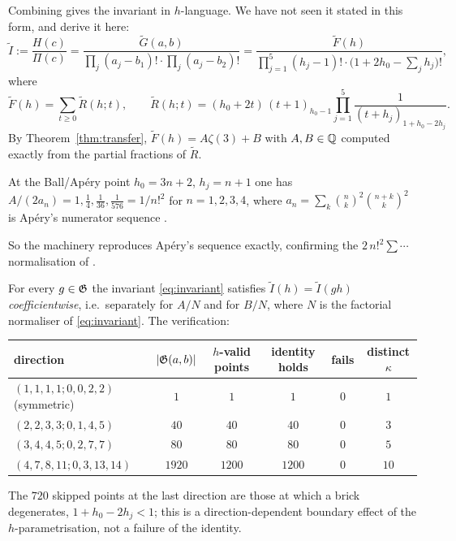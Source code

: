 Combining \cite[eq.~(4.4) and Lemma 9]{Zudilin2004} gives the invariant in $h$-language. We
have not seen it stated in this form, and derive it here:
\begin{equation}\label{eq:invariant}
 \widetilde I:=\frac{H(c)}{\Pi(c)}
  =\frac{\widetilde G(a,b)}{\prod_j(a_j-b_1)!\cdot\prod_j(a_j-b_2)!}
  =\frac{\widetilde F(h)}{\prod_{j=1}^{5}(h_j-1)!\cdot\bigl(1+2h_0-\sum_jh_j\bigr)!},
\end{equation}
where
\begin{equation}\label{eq:Ftilde}
 \widetilde F(h)=\sum_{t\ge0}\widetilde R(h;t),\qquad
 \widetilde R(h;t)=(h_0+2t)\,(t+1)_{h_0-1}\prod_{j=1}^{5}\frac{1}{(t+h_j)_{1+h_0-2h_j}} .
\end{equation}
By Theorem~\ref{thm:transfer}, $\widetilde F(h)=A\zeta(3)+B$ with $A,B\in\mathbb{Q}$ computed
exactly from the partial fractions of $\widetilde R$.

\begin{proposition}[anchor]\label{prop:aperyanchor}
 At the Ball/Ap\'ery point $h_0=3n+2$, $h_j=n+1$ one has
$A/(2a_n)=1,\tfrac14,\tfrac1{36},\tfrac1{576}=1/n!^2$ for $n=1,2,3,4$, where
$a_n=\sum_k\binom nk^2\binom{n+k}k^2$ is Ap\'ery's numerator sequence \cite{Apery1979}.
\end{proposition}

So the machinery reproduces Ap\'ery's sequence exactly, confirming the
$2\,n!^2\sum\cdots$ normalisation of \cite{BallRivoal2001}.

\begin{finding}\label{find:transfer}
For every $g\in\mathfrak{G}$ the invariant \eqref{eq:invariant} satisfies
$\widetilde I(h)=\widetilde I(gh)$ \emph{coefficientwise}, i.e.\ separately for $A/N$ and
for $B/N$, where $N$ is the factorial normaliser of \eqref{eq:invariant}. The verification:
\begin{center}
\tabsmall
\begin{tabular}{lccccc}
\toprule
direction & $|\mathfrak{G}(a,b)|$ & $h$-valid points & identity holds & fails & distinct $\kappa$\\
\midrule
$(1,1,1,1;0,0,2,2)$ (symmetric) & $1$ & $1$ & $1$ & $0$ & $1$\\
$(2,2,3,3;0,1,4,5)$ & $40$ & $40$ & $40$ & $0$ & $3$\\
$(3,4,4,5;0,2,7,7)$ & $80$ & $80$ & $80$ & $0$ & $5$\\
$(4,7,8,11;0,3,13,14)$ & $1920$ & $1200$ & $1200$ & $0$ & $10$\\
\bottomrule
\end{tabular}
\end{center}
The $720$ skipped points at the last direction are those at which a brick degenerates,
$1+h_0-2h_j<1$; this is a direction-dependent boundary effect of the $h$-parametrisation,
not a failure of the identity.
\end{finding}

